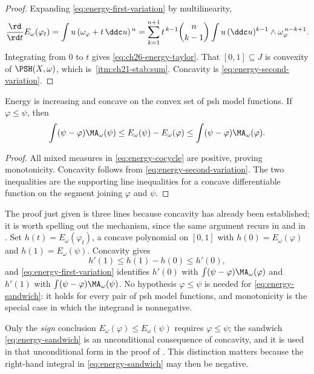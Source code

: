 \begin{proof}
Expanding \eqref{eq:energy-first-variation} by multilinearity,
\[
 \frac{\rd}{\rd t}E_\omega(\varphi_t)
 =\int u\,(\omega_\varphi+t\,\ddc u)^{\,n}
 =\sum_{k=1}^{n+1}t^{\,k-1}\binom{n}{k-1}
   \int u\,(\ddc u)^{k-1}\wedge\omega_\varphi^{\,n-k+1}.
\]
Integrating from \(0\) to \(t\) gives \eqref{eq:ch26-energy-taylor}.  That
\([0,1]\subseteq J\) is convexity of \(\PSH(X,\omega)\), which is
\,\cref{itm:ch21-stab:sum}.  Concavity is
\eqref{eq:energy-second-variation}.
\end{proof}

\begin{corollary}\label{cor:energy-monotone-concave}
Energy is increasing and concave on the convex set of psh model functions.
If \(\varphi\leq\psi\), then
\begin{equation}
\label{eq:energy-sandwich}
 \int(\psi-\varphi)\MA_\omega(\psi)
 \leq E_\omega(\psi)-E_\omega(\varphi)
 \leq\int(\psi-\varphi)\MA_\omega(\varphi).
\end{equation}
\end{corollary}

\begin{proof}
All mixed measures in \eqref{eq:energy-cocycle} are positive, proving
monotonicity. Concavity follows from
\eqref{eq:energy-second-variation}. The two inequalities are the supporting
line inequalities for a concave differentiable function on the segment
joining \(\varphi\) and \(\psi\).
\end{proof}

The proof just given is three lines because concavity has already been
established; it is worth spelling out the mechanism, since the same argument
recurs in  and in
.  Set
\(h(t)=E_\omega(\varphi_t)\), a concave polynomial on \([0,1]\) with
\(h(0)=E_\omega(\varphi)\) and \(h(1)=E_\omega(\psi)\).  Concavity gives
\[
 h'(1)\leq h(1)-h(0)\leq h'(0),
\]
and \eqref{eq:energy-first-variation} identifies \(h'(0)\) with
\(\int(\psi-\varphi)\MA_\omega(\varphi)\) and \(h'(1)\) with
\(\int(\psi-\varphi)\MA_\omega(\psi)\).  No hypothesis \(\varphi\leq\psi\) is
needed for \eqref{eq:energy-sandwich}: it holds for every pair of psh model
functions, and monotonicity is the special case in which the integrand is
nonnegative.

\begin{remark}
\label{rem:ch26-sandwich-scope}
Only the \emph{sign} conclusion \(E_\omega(\varphi)\leq E_\omega(\psi)\)
requires \(\varphi\leq\psi\); the sandwich
\eqref{eq:energy-sandwich} is an unconditional consequence of concavity, and
it is used in that unconditional form in the proof of
.  This distinction matters because the
right-hand integral in \eqref{eq:energy-sandwich} may then be negative.
\end{remark}

